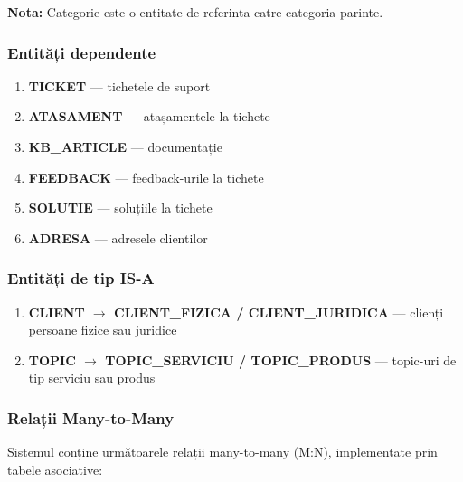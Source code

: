 \textbf{Nota:} Categorie este o entitate de referinta catre categoria parinte.

\subsubsection{Entități dependente}

\begin{enumerate}
    \item \textbf{TICKET} — tichetele de suport
    \item \textbf{ATASAMENT} — atașamentele la tichete
    \item \textbf{KB\_ARTICLE} — documentație
    \item \textbf{FEEDBACK} — feedback-urile la tichete
    \item \textbf{SOLUTIE} — soluțiile la tichete
    \item \textbf{ADRESA} — adresele clientilor
\end{enumerate}

\subsubsection{Entități de tip IS-A}

\begin{enumerate}
    \item \textbf{CLIENT $\rightarrow$ CLIENT\_FIZICA / CLIENT\_JURIDICA} — clienți persoane fizice sau juridice
    \item \textbf{TOPIC $\rightarrow$ TOPIC\_SERVICIU / TOPIC\_PRODUS} — topic-uri de tip serviciu sau produs
\end{enumerate}

\subsubsection{Relații Many-to-Many}

Sistemul conține următoarele relații many-to-many (M:N), implementate prin tabele asociative:

